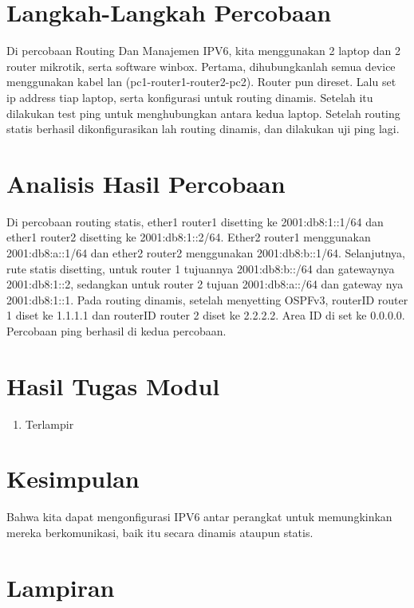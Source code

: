\section{Langkah-Langkah Percobaan}
Di percobaan Routing Dan Manajemen IPV6, kita menggunakan 2 laptop dan 2 router mikrotik, serta software winbox. Pertama, dihubungkanlah semua device menggunakan kabel lan (pc1-router1-router2-pc2). Router pun direset. Lalu set ip address tiap laptop, serta konfigurasi untuk routing dinamis. Setelah itu dilakukan test ping untuk menghubungkan antara kedua laptop. Setelah routing statis berhasil dikonfigurasikan lah routing dinamis, dan dilakukan uji ping lagi.

\section{Analisis Hasil Percobaan}
Di percobaan routing statis, ether1 router1 disetting ke 2001:db8:1::1/64 dan ether1 router2 disetting ke 2001:db8:1::2/64. Ether2 router1 menggunakan 2001:db8:a::1/64 dan ether2 router2 menggunakan 2001:db8:b::1/64. Selanjutnya, rute statis disetting, untuk router 1 tujuannya 2001:db8:b::/64 dan gatewaynya 2001:db8:1::2, sedangkan untuk router 2 tujuan 2001:db8:a::/64 dan gateway nya 2001:db8:1::1. Pada routing dinamis, setelah menyetting OSPFv3, routerID router 1 diset ke 1.1.1.1 dan routerID router 2 diset ke 2.2.2.2. Area ID di set ke 0.0.0.0. Percobaan ping berhasil di kedua percobaan.

\section{Hasil Tugas Modul}
\begin{enumerate}
	\item Terlampir
\end{enumerate}

\section{Kesimpulan}
Bahwa kita dapat mengonfigurasi IPV6 antar perangkat untuk memungkinkan mereka berkomunikasi, baik itu secara dinamis ataupun statis.

\section{Lampiran}
